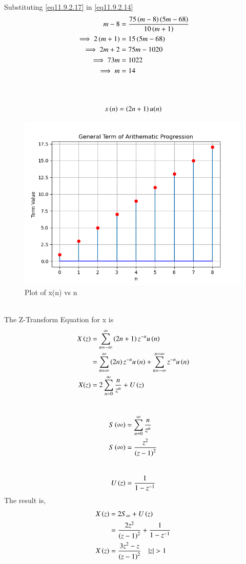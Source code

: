 \documentclass[journal,12pt,onecolumn]{IEEEtran}
\theoremstyle{remark}
\begin{document}
Substituting \eqref{eq11.9.2.17} in \eqref{eq11.9.2.14}\\
 \begin{align}
    m-8&=\frac{75\left(m-8\right)\left(5m-68\right)}{10\left(m+1\right)}\\
    \implies2\left(m+1\right)&=15\left(5m-68\right)\\
    \implies2m+2&=75m-1020\\
    \implies73m&=1022\\
    \implies m&=14
 \end{align}\\
  \\
\begin{align}
    x\left(n\right)=\left(2n+1\right)u(n)
\end{align}
\begin{figure}
    \centering
    \includegraphics[width=1.0\linewidth]{test.png}
    \caption{Plot of x(n) vs n}
    \label{fig:1}
\end{figure}\\
The Z-Transform Equation for x is\\
\begin{align}
    X\left(z\right)&=\sum_{n=-\infty}^{\infty}\left(2n+1\right)z^{-n}u\left(n\right) \\ &=\sum_{n=\infty}^{\infty}\left(2n\right)z^{-n}u\left(n\right) +\sum_{n=-\infty}^{n=\infty}z^{-n}u\left(n\right)\\
    X(z)&=2\sum_{n=0}^{\infty}\dfrac{n}{z^{n}}+U\left(z\right)
\end{align}
\\
\begin{align}
   S\left(\infty\right)&=\sum_{n=0}^{\infty}\dfrac{n}{z^{n}}\\
   S\left(\infty\right)&=\dfrac{z^2}{\left(z-1\right)^{2}}
\end{align}
\\
\begin{align}
   U\left(z\right)=\dfrac{1}{1-z^{-1}}
\end{align}
The result is,
\begin{align}
    X\brak{z}&=2S_\infty+U\brak{z}\\
    &=\dfrac{2z^2}{\brak{z-1}^{2}}+\dfrac{1}{1-z^{-1}}\\
    X\brak{z}&=\dfrac{3z^2-z}{\brak{z-1}^{2}} \quad{|z|>1}
\end{align}
\end{document}

